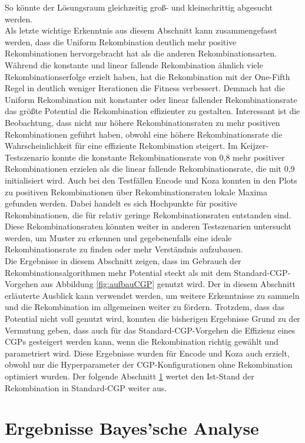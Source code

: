So könnte der Lösungsraum gleichzeitig groß- und kleinschrittig abgesucht werden.\\
Als letzte wichtige Erkenntnis aus diesem Abschnitt kann zusammengefasst werden, dass die Uniform Rekombination deutlich mehr positive Rekombinationen hervorgebracht hat als die anderen Rekombinationsarten.
Während die konstante und linear fallende Rekombination ähnlich viele Rekombinationserfolge erzielt haben, hat die Rekombination mit der One-Fifth Regel in deutlich weniger Iterationen die Fitness verbessert.
Demnach hat die Uniform Rekombination mit konstanter oder linear fallender Rekombinationsrate das größte Potential die Rekombination effizienter zu gestalten.
Interessant ist die Beobachtung, dass nicht nur höhere Rekombinationsraten zu mehr positiven Rekombinationen geführt haben, obwohl eine höhere Rekombinationsrate die Wahrscheinlichkeit für eine effiziente Rekombination steigert.
Im Keijzer-Testszenario konnte die konstante Rekombinationsrate von 0,8 mehr positiver Rekombinationen erzielen als die linear fallende Rekombinationsrate, die mit 0,9 initialisiert wird.
Auch bei den Testfällen Encode und Koza konnten in den Plots zu positiven Rekombinationen über Rekombinationsraten lokale Maxima gefunden werden.
Dabei handelt es sich Hochpunkte für positive Rekombinationen, die für relativ geringe Rekombinationsraten entstanden sind.
Diese Rekombinationsraten könnten weiter in anderen Testszenarien untersucht werden, um Muster zu erkennen und gegebenenfalls eine ideale Rekombinationsrate zu finden oder mehr Verständnis aufzubauen.\\
Die Ergebnisse in diesem Abschnitt zeigen, dass im Gebrauch der Rekombinationsalgorithmen mehr Potential steckt als mit dem Standard-CGP-Vorgehen aus Abbildung \ref{fig:aufbauCGP} genutzt wird.
Der in diesem Abschnitt erläuterte Ausblick kann verwendet werden, um weitere Erkenntnisse zu sammeln und die Rekombination im allgemeinen weiter zu fördern.
Trotzdem, dass das Potential nicht voll genutzt wird, konnten die bisherigen Ergebnisse Grund zu der Vermutung geben, dass auch für das Standard-CGP-Vorgehen die Effizienz eines CGPs gesteigert werden kann, wenn die Rekombination richtig gewählt und parametriert wird.
Diese Ergebnisse wurden für Encode und Koza auch erzielt, obwohl nur die Hyperparameter der CGP-Konfigurationen ohne Rekombination optimiert wurden.
Der folgende Abschnitt \ref{sec:ergebnisseBayes} wertet den Ist-Stand der Rekombination in Standard-CGP weiter aus.


\section{Ergebnisse Bayes'sche Analyse}
\label{sec:ergebnisseBayes}

